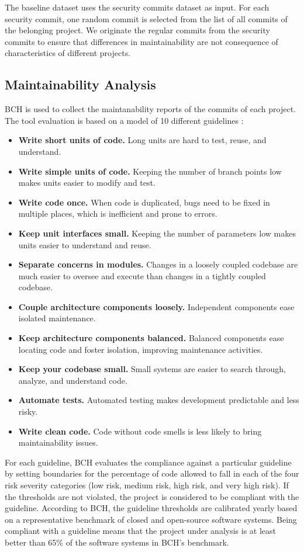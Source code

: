 \documentclass[10pt,conference]{IEEEtran}
\begin{document}
The baseline dataset uses the security commits dataset as input. For each
security commit, one random commit is selected from the list of all commits of
the belonging project. We originate the regular commits from the security
commits to ensure that differences in maintainability are not consequence of
characteristics of different projects.
%
\subsection{Maintainability Analysis}

BCH is used to collect the maintanability reports of the commits of each project. The tool
evaluation is based on a model of 10 different guidelines \cite{Visser:2016:OREILLY}:

\begin{itemize}
	\item \textbf{Write short units of code.} Long units are hard to test, reuse, and understand.
	\item \textbf{Write simple units of code.} Keeping the number of branch points low makes units easier to modify and test.
	\item \textbf{Write code once.} When code is duplicated, bugs need to be fixed in multiple places, which is inefficient and
prone to errors.
	\item \textbf{Keep unit interfaces small.} Keeping the number of parameters low makes units easier to understand and reuse.
	\item \textbf{Separate concerns in modules.} Changes in a loosely
coupled codebase are much easier to oversee and execute
than changes in a tightly coupled codebase.
	\item \textbf{Couple architecture components loosely.} Independent
components ease isolated maintenance.
	\item \textbf{Keep architecture components balanced.} Balanced
components ease locating code and foster isolation,
improving maintenance activities.
	\item \textbf{Keep your codebase small.} Small systems are easier to
search through, analyze, and understand code.
	\item \textbf{Automate tests.} Automated testing makes development
predictable and less risky.
	\item \textbf{Write clean code.} Code without code smells is less likely to bring maintainability issues.
\end{itemize}

For each guideline, BCH evaluates the compliance against a particular guideline by setting boundaries for the percentage of code allowed to fall in each of the four risk severity categories (low risk, medium risk, high risk, and very high risk). If the thresholds are not violated, the project is considered to be compliant with the guideline. According to BCH, the guideline thresholds are calibrated yearly based on a representative benchmark of closed and open-source software systems. Being compliant with a guideline means that the project under analysis is at least better than 65\% of the software systems in BCH’s benchmark.
\end{document}
